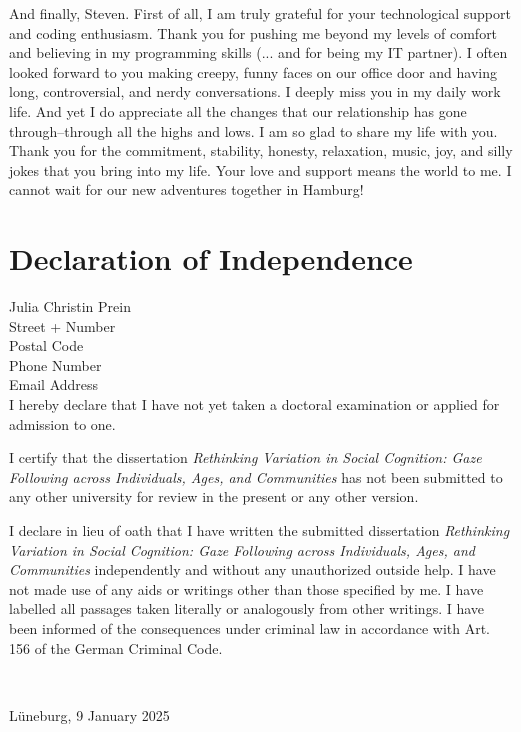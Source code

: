 \documentclass[
]{scrbook}
\begin{document}
\begin{small}
And finally, Steven. First of all, I am truly grateful for your technological support and coding enthusiasm. Thank you for pushing me beyond my levels of comfort and believing in my programming skills (... and for being my IT partner). I often looked forward to you making creepy, funny faces on our office door and having long, controversial, and nerdy conversations. I deeply miss you in my daily work life. And yet I do appreciate all the changes that our relationship has gone through\thinspace --\thinspace through all the highs and lows. I am so glad to share my life with you. Thank you for the commitment, stability, honesty, relaxation, music, joy, and silly jokes that you bring into my life. Your love and support means the world to me. I cannot wait for our new adventures together in Hamburg!

\end{small}

\chapter*{Declaration of Independence}\label{independence}

Julia Christin Prein\\
Street + Number\\
Postal Code\\
Phone Number\\
Email Address\\

I hereby declare that I have not yet taken a doctoral examination or applied for admission to one.

I certify that the dissertation \emph{Rethinking Variation in Social Cognition: Gaze Following across Individuals, Ages, and Communities} has not been submitted to any other university for review in the present or any other version.

I declare in lieu of oath that I have written the submitted dissertation \emph{Rethinking Variation in Social Cognition: Gaze Following across Individuals, Ages, and Communities} independently and without any unauthorized outside help. I have not made use of any aids or writings other than those specified by me. I have labelled all passages taken literally or analogously from other writings. I have been informed of the consequences under criminal law in accordance with Art. 156 of the German Criminal Code.

~
~
~
~

Lüneburg, 9 January 2025
\end{document}
